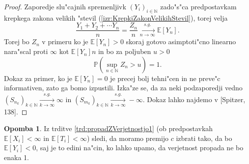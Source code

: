 \documentclass[12pt, a4paper, reqno]{amsart}
\theoremstyle{definition}
\newtheorem{opomba}[definicija]{Opomba}
\theoremstyle{plain}
\newcommand{\N}{\mathbb{N}}
\newcommand{\E}{\mathbb{E}}
\newcommand{\Prob}{\mathbb{P}}
\newcommand{\1}{\mathds{1}}
\begin{document}
        \begin{proof}
            Zaporedje slu"cajnih spremenljivk $(Y_i)_{i\in\N}$ zado"s"ca predpostavkam krepkega zakona
            velikih "stevil (\ref{izr:KrepkiZakonVelikihStevil}), torej velja
            \begin{equation*}
                \frac{Y_1 + Y_2 + \cdots Y_n}{n} = \frac{Z_n}{n} \xrightarrow[n\to\infty]{s.g.} \E\left[Y_n\right].
            \end{equation*}
            Torej bo $Z_n$ v primeru ko je $\E\left[Y_n\right]>0$
             skoraj gotovo asimptoti"cno linearno nara"scal proti $\infty$ kot $\E\left[Y_n\right] n$ in 
             bo za poljuben $u>0$
            \begin{equation*}
                \Prob\left(\sup_{n\in\N}Z_n > u\right) = 1.
            \end{equation*}
            Dokaz za primer, ko je $\E\left[Y_n\right] = 0$ je precej bolj tehni"cen in ne preve"c informativen, zato 
            ga bomo izpustili. Izka"ze se, da za neki podzaporedji vedno
            $(S_{n_k})_{k\in\N} \xrightarrow[k\to\infty]{s.g.}\infty$ in 
            $(S_{m_k})_{k\in\N} \xrightarrow[k\to\infty]{s.g.}-\infty$.
            Dokaz lahko najdemo v [Spitzer, 138].
        \end{proof}

        \begin{opomba}
            Iz trditve \ref{trd:propadZVerjetnostjo1} (ob predpostavkah $\E\left[X_i\right] < \infty$
            in $\E\left[T_i\right] < \infty$) sledi, da moramo premijo $c$ izbrati tako, da bo 
            $\E\left[Y_i\right] < 0$, saj je to edini na"cin, ko lahko upamo, da verjetnost propada ne bo
            enaka 1.
            \label{op:izbiraPremije}
        \end{opomba}
    
\end{document}
